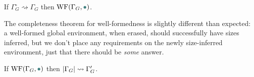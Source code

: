 \begin{theorem}
If $\Gamma_G^\circ \rightsquigarrow \Gamma_G$ then $\WF{\Gamma_G, \mt}$.
\end{theorem}

The completeness theorem for well-formedness is slightly different than expected:
a well-formed global environment, when erased, should successfully have sizes inferred,
but we don't place any requirements on the newly size-inferred environment,
just that there should be \emph{some} answer.

\begin{theorem}
If $\WF{\Gamma_G, \mt}$ then $\lvert\Gamma_G\rvert \rightsquigarrow \Gamma'_G$.
\end{theorem}

